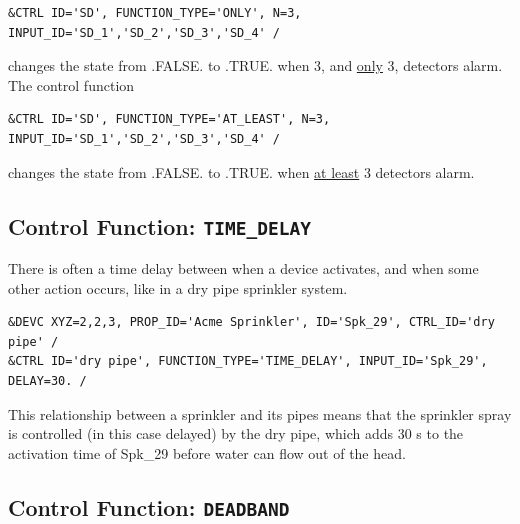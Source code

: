 \documentclass[11pt]{book}
\begin{document}
\footnotesize
\begin{verbatim}
&CTRL ID='SD', FUNCTION_TYPE='ONLY', N=3, INPUT_ID='SD_1','SD_2','SD_3','SD_4' /
\end{verbatim}
\normalsize

\noindent
changes the state from {\ct .FALSE.} to {\ct .TRUE.} when 3, and \underline{only} 3, detectors alarm. The control function

\footnotesize
\begin{verbatim}
&CTRL ID='SD', FUNCTION_TYPE='AT_LEAST', N=3, INPUT_ID='SD_1','SD_2','SD_3','SD_4' /
\end{verbatim}
\normalsize

\noindent
changes the state from {\ct .FALSE.} to {\ct .TRUE.} when \underline{at least} 3 detectors alarm.


\subsection{Control Function: \texorpdfstring{{\tt TIME\_DELAY}}{TIME_DELAY}  }

There is often a time delay between when a device activates, and when some other action occurs, like in a dry pipe sprinkler system.

\footnotesize
\begin{verbatim}
&DEVC XYZ=2,2,3, PROP_ID='Acme Sprinkler', ID='Spk_29', CTRL_ID='dry pipe' /
&CTRL ID='dry pipe', FUNCTION_TYPE='TIME_DELAY', INPUT_ID='Spk_29', DELAY=30. /
\end{verbatim}
\normalsize

\noindent
This relationship between a sprinkler and its pipes means that the sprinkler spray is controlled (in this case delayed) by the
{\ct dry pipe}, which adds 30 s to the activation time of {\ct Spk\_29} before water can flow out of the head. %





\subsection{Control Function: \texorpdfstring{{\tt DEADBAND}}{DEADBAND}  }
\end{document}
